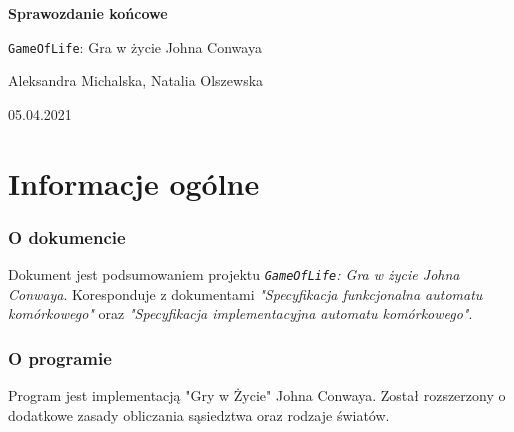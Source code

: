 \documentclass[a4paper]{article}
\begin{document}
\begin{titlepage}
	\begin{center}
		\vspace*{5cm}

	        \Huge
        	\textbf{Sprawozdanie ko\'ncowe}

        	\vspace{1cm}
	        \Huge
        	\texttt{GameOfLife}: Gra w \.zycie Johna Conwaya

    		\vspace{1.5cm}

	        \large
		Aleksandra Michalska, Natalia Olszewska

        	\vfill

	        \vspace{3cm}

		\large 05.04.2021
	\end{center}
\end{titlepage}

\tableofcontents
\newpage


\part{Informacje og\'olne}

\section{O dokumencie}
\quad Dokument jest podsumowaniem projektu \textit{\texttt{GameOfLife}: Gra w \.zycie Johna Conwaya}. 
Koresponduje z dokumentami \textit{"Specyfikacja funkcjonalna automatu kom\'orkowego"} oraz \textit{"Specyfikacja implementacyjna automatu kom\'orkowego"}.

\section{O programie}
\quad Program jest implementacj\k{a} "Gry w \.Zycie" Johna Conwaya. Zosta\l{} rozszerzony o dodatkowe zasady obliczania s\k{a}siedztwa oraz rodzaje \'swiat\'ow. 
\end{document}
